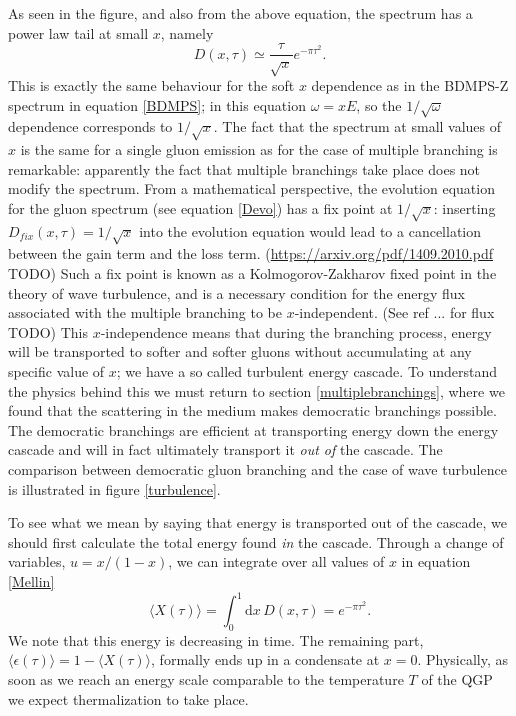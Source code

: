 \documentclass[a4paper,12pt]{article}
\numberwithin{equation}{section}
\begin{document}
As seen in the figure, and also from the above equation, the spectrum has a power law tail at small $x$, namely
\begin{equation}\label{softD}
D(x,\tau)\simeq \frac{\tau}{\sqrt{x}}e^{-\pi\tau^2}.
\end{equation}
This is exactly the same behaviour for the soft $x$ dependence as in the BDMPS-Z spectrum in equation \ref{BDMPS}; in this equation $\omega=xE$, so the $1/\sqrt{\omega}$ dependence corresponds to $1/\sqrt{x}$. The fact that the spectrum at small values of $x$ is the same for a single gluon emission as for the case of multiple branching is remarkable: apparently the fact that multiple branchings take place does not modify the spectrum. From a mathematical perspective, the evolution equation for the gluon spectrum (see equation \eqref{Devo}) has a fix point at $1/\sqrt{x}$: inserting $D_{fix}(x,\tau)=1/\sqrt{x}$ into the evolution equation would lead to a cancellation between the gain term and the loss term. (\url{https://arxiv.org/pdf/1409.2010.pdf} TODO) 
Such a fix point is known as a Kolmogorov-Zakharov fixed point in the theory of wave turbulence, and is a necessary condition for the energy flux associated with the multiple branching to be $x$-independent. (See ref ... for flux TODO) This $x$-independence means that during the branching process, energy will be transported to softer and softer gluons without accumulating at any specific value of $x$; we have a so called turbulent energy cascade. To understand the physics behind this we must return to section \ref{multiplebranchings}, where we found that the scattering in the medium makes democratic branchings possible. The democratic branchings are efficient at transporting energy down the energy cascade and will in fact ultimately transport it \emph{out of} the cascade. The comparison between democratic gluon branching and the case of wave turbulence is illustrated in figure \ref{turbulence}.



To see what we mean by saying that energy is transported out of the cascade, we should first calculate the total energy found \emph{in} the cascade. Through a change of variables, $u=x/(1-x)$, we can integrate over all values of $x$ in equation \eqref{Mellin}
\begin{equation}\label{X}
\langle X(\tau)\rangle=\int_0^1 \mathrm{d}x\, D(x,\tau) = e^{-\pi\tau^2}.
\end{equation}
We note that this energy is decreasing in time. The remaining part, $\langle \epsilon (\tau) \rangle = 1- \langle X(\tau)\rangle$, formally ends up in a condensate at $x=0$. Physically, as soon as we reach an energy scale comparable to the temperature $T$ of the QGP we expect thermalization to take place.
\end{document}
